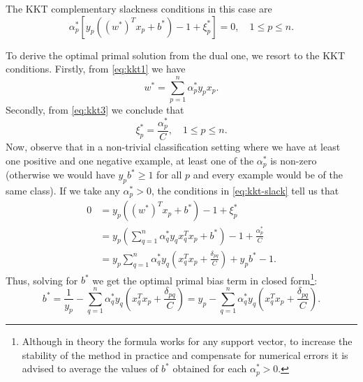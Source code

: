\documentclass[11pt]{article}
\begin{document}
The KKT complementary slackness conditions in this case are
\begin{equation}
  \label{eq:kkt-slack}
 \alpha_p^*[y_p((w^*)^Tx_p+b^*)-1+\xi_p^*] =0, \quad 1\leq p\leq n.
\end{equation}

To derive the optimal primal solution from the dual one, we resort to the KKT conditions. Firstly, from \eqref{eq:kkt1} we have
\[
w^* = \sum_{p=1}^n \alpha_p^*y_px_p.
\]
Secondly, from \eqref{eq:kkt3} we conclude that
\[
\xi_p^* = \frac{\alpha_p^*}{C},\quad 1\leq p\leq n.
\]
Now, observe that in a non-trivial classification setting where we have at least one positive and one negative example, at least one of the $\alpha^*_p$ is non-zero (otherwise we would have $y_pb^*\geq 1$ for all $p$ and every example would be of the same class). If we take any $\alpha_p^*>0$, the conditions in \eqref{eq:kkt-slack} tell us that
\begin{align*}
0 &=y_p((w^*)^Tx_p+b^*)-1+\xi_p^*\\
&= y_p\left(\sum_{q=1}^n \alpha_q^*y_qx_q^Tx_p +b^*\right) - 1 + \frac{\alpha_p^*}{C}\\
&= y_p\sum_{q=1}^n \alpha_q^*y_q\left(x_q^Tx_p + \frac{\delta_{pq}}{C}\right)+ y_pb^* -1.
\end{align*}
Thus, solving for $b^*$ we get the optimal primal bias term in closed form\footnote{Although in theory the formula works for any support vector, to increase the stability of the method in practice and compensate for numerical errors it is advised to average the values of $b^*$ obtained for each $\alpha^*_p>0$.}:
\[
b^* = \frac{1}{y_p} - \sum_{q=1}^n \alpha_q^*y_q\left(x_q^Tx_p + \frac{\delta_{pq}}{C}\right)=y_p - \sum_{q=1}^n \alpha_q^*y_q\left(x_q^Tx_p + \frac{\delta_{pq}}{C}\right).
\]
\end{document}
